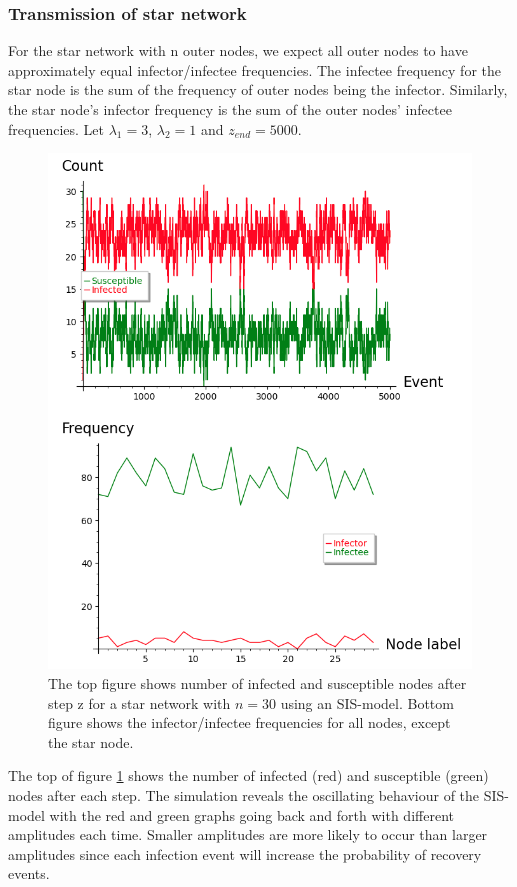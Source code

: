 \documentclass[12pt]{article} %
\numberwithin{equation}{section}
\begin{document}
\subsubsection{Transmission of star network}\label{simsis1}
For the star network with n outer nodes, we expect all outer nodes to have approximately equal infector/infectee frequencies. The infectee frequency for the star node is the sum of the frequency of outer nodes being the infector. Similarly, the star node's infector frequency is the sum of the outer nodes' infectee frequencies. Let $\lambda_1 = 3$, $\lambda_2 = 1$ and $z_{end} = 5000$.

\begin{figure}
    \centering
    \includegraphics[scale=0.7]{SISstar1.png}   
    \caption{The top figure shows number of infected and susceptible nodes after step z for a star network with $n = 30$ using an SIS-model. Bottom figure shows the infector/infectee frequencies for all nodes, except the star node.}
    \label{starSISplot1}
\end{figure}
The top of figure \ref{starSISplot1} shows the number of infected (red) and susceptible (green) nodes after each step. The simulation reveals the oscillating behaviour of the SIS-model with the red and green graphs going back and forth with different amplitudes each time. Smaller amplitudes are more likely to occur than larger amplitudes since each infection event will increase the probability of recovery events. 
\end{document}
